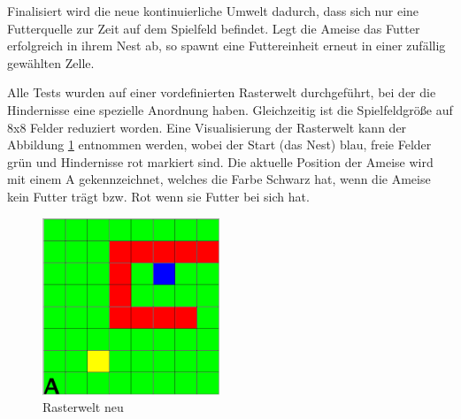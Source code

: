 \par 
Finalisiert wird die neue kontinuierliche Umwelt dadurch, dass sich nur eine Futterquelle zur Zeit auf dem Spielfeld befindet. Legt die Ameise das Futter erfolgreich in ihrem Nest ab, so spawnt eine Futtereinheit erneut in einer zufällig gewählten Zelle.
\par 
Alle Tests wurden auf einer vordefinierten Rasterwelt durchgeführt, bei der die Hindernisse eine spezielle Anordnung haben. Gleichzeitig ist die Spielfeldgröße auf 8x8 Felder reduziert worden. Eine Visualisierung der Rasterwelt  kann der Abbildung \ref{fig:rasterweltNeu} entnommen werden, wobei der Start (das Nest) blau, freie Felder grün und Hindernisse rot markiert sind. Die aktuelle Position der Ameise wird mit einem \glqq A\grqq{} gekennzeichnet, welches die Farbe Schwarz hat, wenn die Ameise kein Futter trägt bzw. Rot wenn sie Futter bei sich hat.
\begin{figure}[H]
    \begin{center}
    \includegraphics[width=200px]{images/rasterwelt_neu.png}  \end{center}
    \caption{Rasterwelt neu}
    \label{fig:rasterweltNeu}
  \end{figure}

